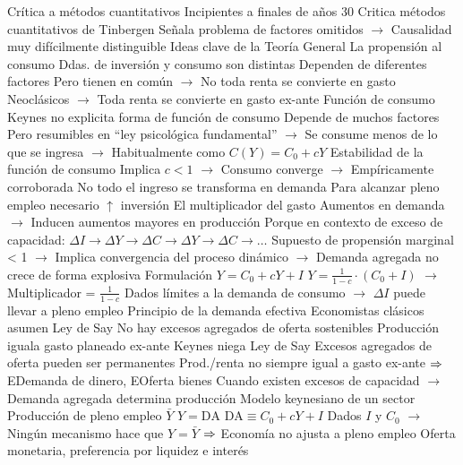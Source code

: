 \documentclass{nuevotema}
\begin{document}
\begin{esquemal}
				\4 Crítica a métodos cuantitativos
				\4[] Incipientes a finales de años 30
				\4[] Critica métodos cuantitativos de Tinbergen
				\4[] Señala problema de factores omitidos
				\4[] $\to$ Causalidad muy difícilmente distinguible
		\2 Ideas clave de la Teoría General
			\3 La propensión al consumo
				\4 Ddas. de inversión y consumo son distintas
				\4[] Dependen de diferentes factores
				\4[] Pero tienen en común
				\4[] $\to$ No toda renta se convierte en gasto
				\4[] Neoclásicos
				\4[] $\to$ Toda renta se convierte en gasto ex-ante
				\4 Función de consumo
				\4[] Keynes no explicita forma de función de consumo
				\4[] Depende de muchos factores
				\4[] Pero resumibles en ``ley psicológica fundamental''
				\4[] $\to$ Se consume menos de lo que se ingresa
				\4[] $\to$ Habitualmente como $C(Y) = C_0 + cY$
				\4 Estabilidad de la función de consumo
				\4[] Implica $c<1$
				\4[] $\to$ Consumo converge
				\4[] $\to$ Empíricamente corroborada
				\4[$\then$] No todo el ingreso se transforma en demanda
				\4[$\then$] Para alcanzar pleno empleo necesario $\uparrow$ inversión
			\3 El multiplicador del gasto
				\4 Aumentos en demanda
				\4[] $\to$ Inducen aumentos mayores en producción
				\4[] Porque en contexto de exceso de capacidad:
				\4[] $\Delta I \to \Delta Y \to \Delta C \to \Delta Y \to \Delta C \to \ldots $
				\4 Supuesto de propensión marginal < 1
				\4[] $\to$ Implica convergencia del proceso dinámico
				\4[] $\to$ Demanda agregada no crece de forma explosiva
				\4 Formulación
				\4[] $Y = C_0 + cY + I$
				\4[] $Y = \frac{1}{1-c}\cdot (C_0 + I)$
				\4[] $\to$ Multiplicador = $\frac{1}{1-c}$
				\4[] 
				\4 Dados límites a la demanda de consumo
				\4[] $\to$ $\Delta I$ puede llevar a pleno empleo
			\3 Principio de la demanda efectiva
				\4 Economistas clásicos asumen Ley de Say
				\4[] No hay excesos agregados de oferta sostenibles
				\4[] Producción iguala gasto planeado ex-ante
				\4 Keynes niega Ley de Say
				\4[] Excesos agregados de oferta pueden ser permanentes
				\4[] Prod./renta no siempre igual a gasto ex-ante
				\4[] $\then$ EDemanda de dinero, EOferta bienes
				\4 Cuando existen excesos de capacidad
				\4[] $\to$ Demanda agregada determina producción
				\4 Modelo keynesiano de un sector
				\4[] Producción de pleno empleo $\bar{Y}$
				\4[] $Y = \text{DA}$
				\4[] $\text{DA} \equiv C_0 + cY + I$
				\4[] 
				\4[] Dados $I$ y $C_0$
				\4[] $\to$ Ningún mecanismo hace que $Y=\bar{Y}$
				\4[] $\then$ Economía no ajusta a pleno empleo
			\3 Oferta monetaria, preferencia por liquidez e interés

\end{esquemal}
\end{document}
